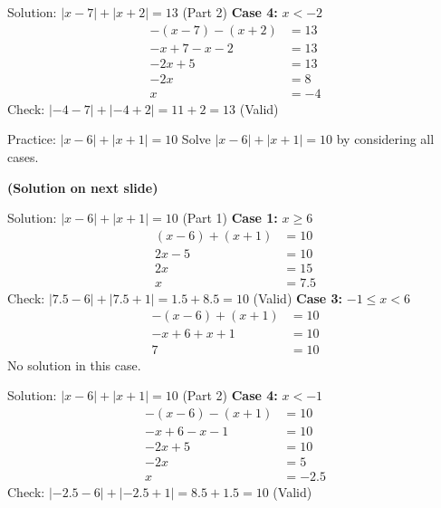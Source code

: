 \documentclass[aspectratio=169]{beamer}
\begin{document}
\begin{frame}{Solution: $|x-7| + |x+2| = 13$ (Part 2)}
    \footnotesize
    \textbf{Case 4:} $x < -2$
    \begin{align*}
        -(x-7) - (x+2) &= 13 \\
        -x+7-x-2 &= 13 \\
        -2x+5 &= 13 \\
        -2x &= 8 \\
        x &= -4
    \end{align*}
    Check: $|-4-7| + |-4+2| = 11 + 2 = 13$ (Valid)
\end{frame}

\begin{frame}{Practice: $|x-6| + |x+1| = 10$}
    \footnotesize
    Solve $|x-6| + |x+1| = 10$ by considering all cases.\par
    \textbf{(Solution on next slide)}
\end{frame}

\begin{frame}{Solution: $|x-6| + |x+1| = 10$ (Part 1)}
    \footnotesize
    \textbf{Case 1:} $x \geq 6$
    \begin{align*}
        (x-6) + (x+1) &= 10 \\
        2x - 5 &= 10 \\
        2x &= 15 \\
        x &= 7.5
    \end{align*}
    Check: $|7.5-6| + |7.5+1| = 1.5 + 8.5 = 10$ (Valid)
    \vspace{1em}
    \textbf{Case 3:} $-1 \leq x < 6$
    \begin{align*}
        -(x-6) + (x+1) &= 10 \\
        -x+6+x+1 &= 10 \\
        7 &= 10
    \end{align*}
    No solution in this case.
\end{frame}

\begin{frame}{Solution: $|x-6| + |x+1| = 10$ (Part 2)}
    \footnotesize
    \textbf{Case 4:} $x < -1$
    \begin{align*}
        -(x-6) - (x+1) &= 10 \\
        -x+6-x-1 &= 10 \\
        -2x+5 &= 10 \\
        -2x &= 5 \\
        x &= -2.5
    \end{align*}
    Check: $|-2.5-6| + |-2.5+1| = 8.5 + 1.5 = 10$ (Valid)
\end{frame}
\end{document}
